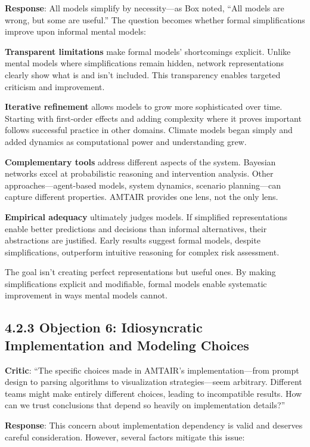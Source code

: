 \documentclass[
  11pt,
  letterpaper,
  openany]{book}
\begin{document}
\textbf{Response}: All models simplify by necessity---as Box noted,
``All models are wrong, but some are useful.'' The question becomes
whether formal simplifications improve upon informal mental models:

\textbf{Transparent limitations} make formal models' shortcomings
explicit. Unlike mental models where simplifications remain hidden,
network representations clearly show what is and isn't included. This
transparency enables targeted criticism and improvement.

\textbf{Iterative refinement} allows models to grow more sophisticated
over time. Starting with first-order effects and adding complexity where
it proves important follows successful practice in other domains.
Climate models began simply and added dynamics as computational power
and understanding grew.

\textbf{Complementary tools} address different aspects of the system.
Bayesian networks excel at probabilistic reasoning and intervention
analysis. Other approaches---agent-based models, system dynamics,
scenario planning---can capture different properties. AMTAIR provides
one lens, not the only lens.

\textbf{Empirical adequacy} ultimately judges models. If simplified
representations enable better predictions and decisions than informal
alternatives, their abstractions are justified. Early results suggest
formal models, despite simplifications, outperform intuitive reasoning
for complex risk assessment.

The goal isn't creating perfect representations but useful ones. By
making simplifications explicit and modifiable, formal models enable
systematic improvement in ways mental models cannot.

\subsection{4.2.3 Objection 6: Idiosyncratic Implementation and Modeling
Choices}\label{sec-idiosyncratic}

\textbf{Critic}: ``The specific choices made in AMTAIR's
implementation---from prompt design to parsing algorithms to
visualization strategies---seem arbitrary. Different teams might make
entirely different choices, leading to incompatible results. How can we
trust conclusions that depend so heavily on implementation details?''

\textbf{Response}: This concern about implementation dependency is valid
and deserves careful consideration. However, several factors mitigate
this issue:
\end{document}
